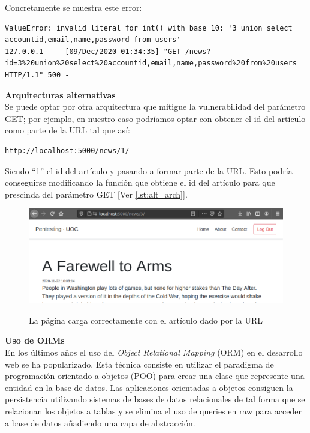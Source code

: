 \documentclass[a4paper,oneside]{article}
\begin{document}
Concretamente se muestra este error:
\begin{lstlisting}
ValueError: invalid literal for int() with base 10: '3 union select accountid,email,name,password from users'
127.0.0.1 - - [09/Dec/2020 01:34:35] "GET /news?id=3%20union%20select%20accountid,email,name,password%20from%20users HTTP/1.1" 500 -
\end{lstlisting}

\textbf{Arquitecturas alternativas}\\
Se puede optar por otra arquitectura que mitigue la vulnerabilidad del parámetro GET; por ejemplo, en nuestro caso podríamos optar con obtener el id del artículo como parte de la URL tal que así:
\begin{lstlisting}
http://localhost:5000/news/1/
\end{lstlisting}
Siendo ``1'' el id del artículo y pasando a formar parte de la URL. Esto podría conseguirse modificando la función que obtiene el id del artículo para que prescinda del parámetro GET [Ver \ref{lst:alt_arch}].\\



\vspace{2cm}
\begin{figure}[h!]
  \centering
  \includegraphics[scale=0.4]{images/alt_arch_ok.png}\\
  \caption{La página carga correctamente con el artículo dado por la URL}
  \label{fig:alt_arch}
\end{figure}

\pagebreak
\textbf{Uso de ORMs}\\
En los últimos años el uso del \textit{Object Relational Mapping} (ORM) en el desarrollo web se ha popularizado. Esta técnica consiste en utilizar el paradigma de programación orientado a objetos (POO) para crear una clase que represente una entidad en la base de datos. Las aplicaciones orientadas a objetos consiguen la persistencia utilizando sistemas de bases de datos relacionales de tal forma que se relacionan los objetos a tablas \cite{orm} y se elimina el uso de queries en raw para acceder a base de datos añadiendo una capa de abstracción.\\
\end{document}
